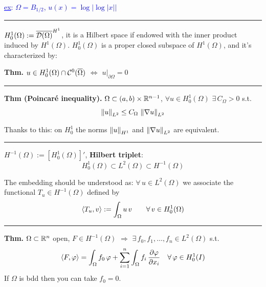 \textcolor{blue}{\underline{ex}: $\Omega=B_{1/2}$, $u(x)=\log\left| \log \left| x \right| \right|$ }

\rule{0.31\textwidth}{0.2pt}
\smallskip

$H^1_0(\Omega):=\overline{\mathcal{D}(\Omega)}^{H^1}$, it is a Hilbert space if endowed with the inner product induced by $H^1(\Omega)$. $H^1_0(\Omega)$ is a proper closed subspace of $H^1(\Omega)$, and it's characterized by:

\smallskip

\textbf{Thm.} $u\in H^1_0(\Omega)\cap \mathcal{C}^0(\overline{\Omega})$ $\Longleftrightarrow$ $u\big|_{\partial \Omega}=0$

\rule{0.31\textwidth}{0.2pt}
\smallskip

\textbf{Thm (Poincaré inequality).} $\Omega\subset (a,b)\times \mathbb{R}^{n-1}$, $\forall u\in H^1_0(\Omega)$ $\exists\,C_\Omega>0$ s.t.
\begin{equation*}
\left\lVert u \right\rVert_{L^2}\leq C_\Omega\, \left\lVert \nabla u \right\rVert_{L^2}
\end{equation*}

\smallskip

Thanks to this: on $H^1_0$ the norms $\left\lVert u \right\rVert_{H^1}$ and $\left\lVert \nabla u \right\rVert_{L^2}$ are equivalent.

\rule{0.31\textwidth}{0.2pt}
\smallskip

$H^{-1}(\Omega):=\left[ H^1_0(\Omega) \right]'$,  \textbf{Hilbert triplet}:
\begin{equation*}
H_0^1(\Omega)\subset L^2(\Omega) \subset H^{-1}(\Omega)
\end{equation*}

The embedding should be understood as: $\forall\, u\in L^2(\Omega)$ we associate the functional $T_u\in H^{-1}(\Omega)$ defined by
\begin{equation*}
\left\langle T_u,v \right\rangle:=\int_\Omega u\,v\qquad \forall\, v\in H^1_0(\Omega)
\end{equation*}

\rule{0.31\textwidth}{0.2pt}
\smallskip

\textbf{Thm.} $\Omega\subset \mathbb{R}^n$ open, $F\in H^{-1}(\Omega)$ $\Longrightarrow$ $\exists\,f_0,f_1,\dots,f_n\in L^2(\Omega)$ s.t.
\begin{equation*}
\left\langle F,\varphi \right\rangle=\int_\Omega f_0\,\varphi+\sum_{i=1}^n \int_\Omega f_i\,\frac{\partial\varphi}{\partial x_i}\quad \forall\,\varphi\in H^1_0(I)
\end{equation*}
If $\Omega$ is bdd then you can take $f_0=0$.

\medskip

